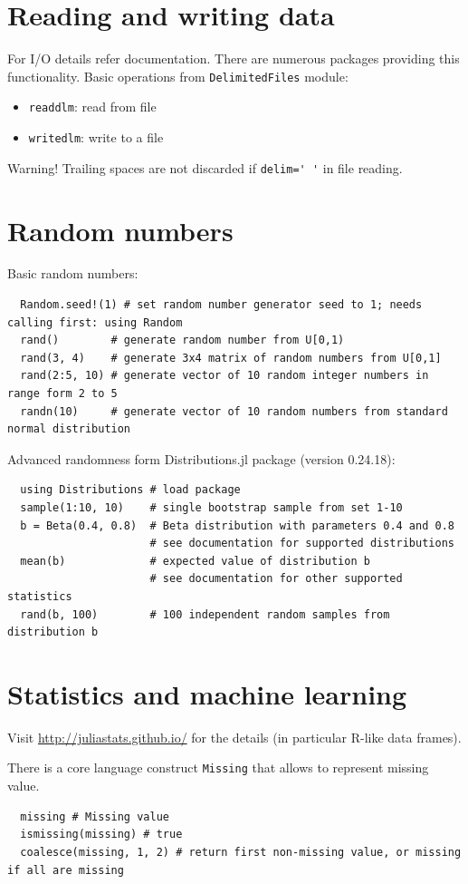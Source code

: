 \documentclass[10pt,a4paper]{article}
\begin{document}
\section{Reading and writing data}
For I/O details refer documentation. There are numerous packages providing this
functionality. Basic operations from \lstinline|DelimitedFiles| module:
\begin{itemize}
  \item \lstinline|readdlm|: read from file
  \item \lstinline|writedlm|: write to a file
\end{itemize}

Warning! Trailing spaces are not discarded if \lstinline|delim=' '| in file reading.

\section{Random numbers}
Basic random numbers:
\begin{lstlisting}
  Random.seed!(1) # set random number generator seed to 1; needs calling first: using Random
  rand()        # generate random number from U[0,1)
  rand(3, 4)    # generate 3x4 matrix of random numbers from U[0,1]
  rand(2:5, 10) # generate vector of 10 random integer numbers in range form 2 to 5
  randn(10)     # generate vector of 10 random numbers from standard normal distribution
\end{lstlisting}

Advanced randomness form Distributions.jl package (version 0.24.18):
\begin{lstlisting}
  using Distributions # load package
  sample(1:10, 10)    # single bootstrap sample from set 1-10
  b = Beta(0.4, 0.8)  # Beta distribution with parameters 0.4 and 0.8
                      # see documentation for supported distributions
  mean(b)             # expected value of distribution b
                      # see documentation for other supported statistics
  rand(b, 100)        # 100 independent random samples from distribution b
\end{lstlisting}

\section{Statistics and machine learning}
Visit \url{http://juliastats.github.io/} for the details (in particular R-like
data frames).

There is a core language construct \lstinline|Missing| that allows to represent
missing value.
\begin{lstlisting}
  missing # Missing value
  ismissing(missing) # true
  coalesce(missing, 1, 2) # return first non-missing value, or missing if all are missing
\end{lstlisting}
\end{document}
